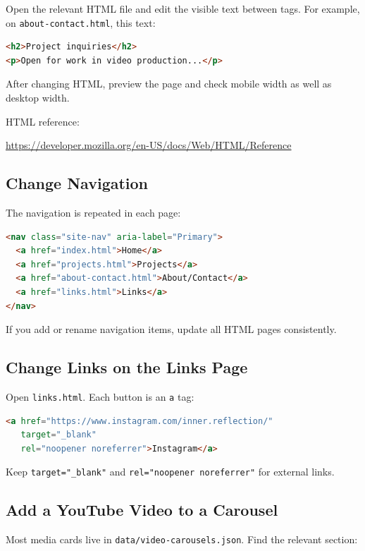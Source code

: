 \documentclass[11pt]{article}
\begin{document}
Open the relevant HTML file and edit the visible text between tags. For example, on \texttt{about-contact.html}, this text:

\begin{lstlisting}[language=HTML]
<h2>Project inquiries</h2>
<p>Open for work in video production...</p>
\end{lstlisting}

After changing HTML, preview the page and check mobile width as well as desktop width.

HTML reference:

\url{https://developer.mozilla.org/en-US/docs/Web/HTML/Reference}

\subsection{Change Navigation}

The navigation is repeated in each page:

\begin{lstlisting}[language=HTML]
<nav class="site-nav" aria-label="Primary">
  <a href="index.html">Home</a>
  <a href="projects.html">Projects</a>
  <a href="about-contact.html">About/Contact</a>
  <a href="links.html">Links</a>
</nav>
\end{lstlisting}

If you add or rename navigation items, update all HTML pages consistently.

\subsection{Change Links on the Links Page}

Open \texttt{links.html}. Each button is an \texttt{a} tag:

\begin{lstlisting}[language=HTML]
<a href="https://www.instagram.com/inner.reflection/"
   target="_blank"
   rel="noopener noreferrer">Instagram</a>
\end{lstlisting}

Keep \texttt{target="\_blank"} and \texttt{rel="noopener noreferrer"} for external links.

\subsection{Add a YouTube Video to a Carousel}

Most media cards live in \texttt{data/video-carousels.json}. Find the relevant section:
\end{document}
